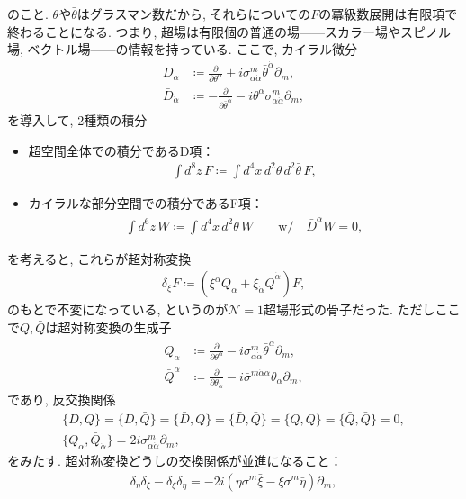 \documentclass{ltjsarticle}
\theoremstyle{definition}
\begin{document}
のこと. $\theta$や$\bar\theta$はグラスマン数だから, それらについての$F$の冪級数展開は有限項で終わることになる. つまり, 超場は有限個の普通の場------スカラー場やスピノル場, ベクトル場------の情報を持っている. ここで, カイラル微分
\begin{align}
  D_\alpha&\coloneqq\frac\partial{\partial\theta^\alpha}+i\sigma^m_{\alpha\dot\alpha}\bar\theta^{\dot\alpha}\partial_m,\\
  \bar D_{\dot\alpha}&\coloneqq-\frac\partial{\partial\bar\theta^{\dot\alpha}}-i\theta^\alpha\sigma^m_{\alpha\dot\alpha}\partial_m,
\end{align}
を導入して, 2種類の積分
\begin{itemize}
  \item 超空間全体での積分であるD項：
  \begin{gather}
    \int d^8z\,F\coloneqq\int d^4x\,d^2\theta\,d^2\bar\theta\,F,
  \end{gather}
  \item カイラルな部分空間での積分であるF項：
  \begin{gather}
    \int d^6z\,W\coloneqq\int d^4x\,d^2\theta\, W\qquad\mathrm{w/}\quad\bar D^{\dot\alpha}W=0,
  \end{gather}
\end{itemize}
を考えると, これらが超対称変換
\begin{gather}
  \delta_\xi F\coloneqq(\xi^\alpha Q_\alpha+\bar\xi_{\dot\alpha}\bar Q^{\dot\alpha})F,
\end{gather}
のもとで不変になっている, というのが$\mathcal N=1$超場形式の骨子だった. ただしここで$Q,\bar Q$は超対称変換の生成子
\begin{align}
  Q_\alpha&\coloneqq\frac\partial{\partial\theta^\alpha}-i\sigma^m_{\alpha\dot\alpha}\bar\theta^{\dot\alpha}\partial_m,\\
  \bar Q^{\dot\alpha}&\coloneqq\frac\partial{\partial\theta_{\dot\alpha}}-i\bar\sigma^{m\dot\alpha\alpha}\theta_\alpha\partial_m,
\end{align}
であり, 反交換関係
\begin{gather}
  \{D,Q\}=\{D,\bar Q\}=\{\bar D,Q\}=\{\bar D,\bar Q\}=\{Q,Q\}=\{\bar Q,\bar Q\}=0,\\
  \{Q_\alpha,\bar Q_{\dot\alpha}\}=2i\sigma^m_{\alpha\dot\alpha}\partial_m,
\end{gather}
をみたす. 超対称変換どうしの交換関係が並進になること：
\begin{gather}
  \delta_\eta\delta_\xi-\delta_\xi\delta_\eta=-2i\left(\eta\sigma^m\bar\xi-\xi\sigma^m\bar\eta\right)\partial_m,
\end{gather}
\end{document}

